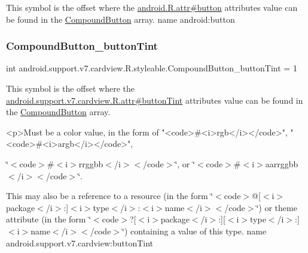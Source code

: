 This symbol is the offset where the \hyperlink{}{android.\+R.\+attr\#button} attribute\textquotesingle{}s value can be found in the \hyperlink{classandroid_1_1support_1_1v7_1_1cardview_1_1R_1_1styleable_a4e5dd24a739b20fb1bfbda95e04d1d75}{Compound\+Button} array.  name android\+:button \mbox{\label{classandroid_1_1support_1_1v7_1_1cardview_1_1R_1_1styleable_a7295e2bf20744e3120536704e8484f05}} 
\subsubsection{\texorpdfstring{Compound\+Button\+\_\+button\+Tint}{CompoundButton\_buttonTint}}
{\footnotesize\ttfamily int android.\+support.\+v7.\+cardview.\+R.\+styleable.\+Compound\+Button\+\_\+button\+Tint = 1\hspace{0.3cm}{\ttfamily [static]}}

This symbol is the offset where the \hyperlink{classandroid_1_1support_1_1v7_1_1cardview_1_1R_1_1attr_a0db1503d1c599ba43238d88c132063e7}{android.\+support.\+v7.\+cardview.\+R.\+attr\#button\+Tint} attribute\textquotesingle{}s value can be found in the \hyperlink{classandroid_1_1support_1_1v7_1_1cardview_1_1R_1_1styleable_a4e5dd24a739b20fb1bfbda95e04d1d75}{Compound\+Button} array.

\begin{DoxyVerb}      <p>Must be a color value, in the form of "<code>#<i>rgb</i></code>", "<code>#<i>argb</i></code>",
\end{DoxyVerb}
 \char`\"{}$<$code$>$\#$<$i$>$rrggbb$<$/i$>$$<$/code$>$\char`\"{}, or \char`\"{}$<$code$>$\#$<$i$>$aarrggbb$<$/i$>$$<$/code$>$\char`\"{}. 

This may also be a reference to a resource (in the form \char`\"{}$<$code$>$@\mbox{[}$<$i$>$package$<$/i$>$\+:\mbox{]}$<$i$>$type$<$/i$>$\+:$<$i$>$name$<$/i$>$$<$/code$>$\char`\"{}) or theme attribute (in the form \char`\"{}$<$code$>$?\mbox{[}$<$i$>$package$<$/i$>$\+:\mbox{]}\mbox{[}$<$i$>$type$<$/i$>$\+:\mbox{]}$<$i$>$name$<$/i$>$$<$/code$>$\char`\"{}) containing a value of this type.  name android.\+support.\+v7.\+cardview\+:button\+Tint \mbox{\label{classandroid_1_1support_1_1v7_1_1cardview_1_1R_1_1styleable_a2ca542fc884ad767a454fac8fce935bb}} 
